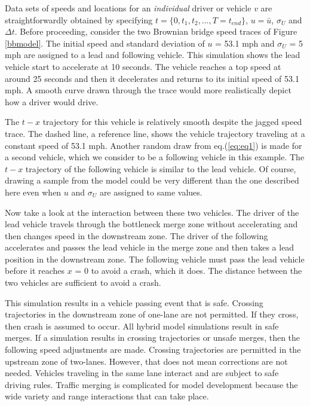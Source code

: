 \documentclass[Proceedings]{ascelike}
\begin{document}
Data sets of speeds and locations for an \emph{individual} driver or vehicle $v$ are straightforwardly obtained by specifying $t = \{0,t_1,t_2,\ldots,T = t_{end}\}$, $u = \bar{u}$, $\sigma_U$ and $\Delta t$. Before proceeding, consider the two Brownian bridge speed traces of Figure \ref{bbmodel}.  The initial speed  and standard deviation  of $u$ = 53.1 mph and $\sigma_U$ = 5 mph are assigned to a lead and following vehicle. This simulation shows the lead vehicle start to accelerate at 10 seconds. The vehicle reaches a top speed at around 25 seconds and then it decelerates and returns to its initial speed of 53.1 mph.  A smooth curve drawn through the trace would more realistically depict how a driver would drive. 

The $t-x$ trajectory for this vehicle is relatively smooth despite the jagged  speed trace. The dashed line, a reference line, shows the vehicle trajectory  traveling at a constant speed of 53.1 mph. Another random draw from eq.(\ref{eq:eq1}) is made for a second vehicle, which we consider to be a following vehicle in this example. The $t-x$ trajectory of the following vehicle is similar to the lead vehicle. Of course, drawing a sample from the model could  be very different than the one described here even when $u$ and  $\sigma_U$  are assigned to same values.
 
Now take a look at the interaction between these two vehicles. The driver of the lead vehicle travels through the bottleneck merge zone without accelerating and then changes speed in the downstream zone. The driver of the following accelerates and passes the lead vehicle in the merge zone and then takes a lead position in the downstream zone. The following vehicle must pass the lead vehicle before it reaches $x$ = 0 to avoid a crash, which it does. The distance between the two vehicles are sufficient to avoid a crash. 

This simulation results in a vehicle passing event that is safe. Crossing trajectories in the downstream zone of one-lane are not permitted. If they cross, then crash is assumed to occur. All hybrid model simulations result in safe merges. If a simulation results in crossing trajectories or unsafe merges, then the following speed adjustments are made. Crossing trajectories are permitted in the upstream zone of two-lanes. However, that does not mean corrections are not needed.  Vehicles traveling in the same lane interact and are subject to safe driving rules. Traffic merging is complicated for model development because the wide variety and range interactions that can take place.
\end{document}
